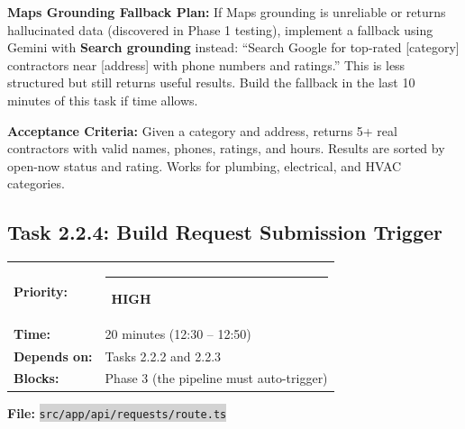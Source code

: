 \documentclass[11pt, a4paper]{article}
\newcommand{\highpri}{\textcolor{highamber}{\rule{6pt}{6pt}}~\textcolor{highamber}{\scriptsize\textbf{HIGH}}}
\newcommand{\code}[1]{\texttt{\small\colorbox{lightgray}{#1}}}
\begin{document}
\begin{warningbox}
\textbf{Maps Grounding Fallback Plan:} If Maps grounding is unreliable or returns hallucinated data (discovered in Phase 1 testing), implement a fallback using Gemini with \textbf{Search grounding} instead: ``Search Google for top-rated [category] contractors near [address] with phone numbers and ratings.'' This is less structured but still returns useful results. Build the fallback in the last 10 minutes of this task if time allows.
\end{warningbox}

\textbf{Acceptance Criteria:} Given a category and address, returns 5+ real contractors with valid names, phones, ratings, and hours. Results are sorted by open-now status and rating. Works for plumbing, electrical, and HVAC categories.

\vspace{1em}

\subsection{Task 2.2.4: Build Request Submission Trigger}

\begin{tabularx}{\textwidth}{lX}
\textbf{Priority:} & \highpri \\
\textbf{Time:} & 20 minutes (12:30 -- 12:50) \\
\textbf{Depends on:} & Tasks 2.2.2 and 2.2.3 \\
\textbf{Blocks:} & Phase 3 (the pipeline must auto-trigger) \\
\end{tabularx}

\vspace{0.3em}

\textbf{File:} \code{src/app/api/requests/route.ts}
\end{document}
